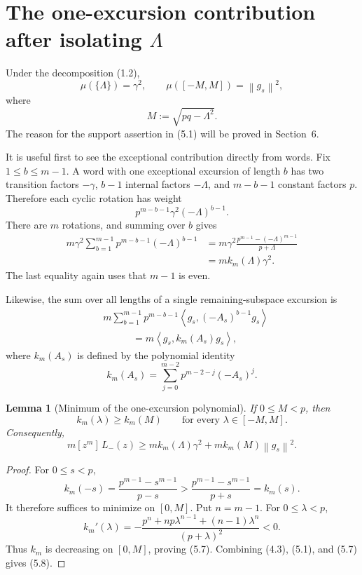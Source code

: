 \documentclass[11pt]{article}
\newtheorem{lemma}[proposition]{Lemma}
\newcommand{\ip}[2]{\left\langle #1,#2\right\rangle}
\newcommand{\norm}[1]{\left\lVert #1\right\rVert}
\newcommand{\coeff}[2]{[z^{#1}]\,#2}
\begin{document}
\section{The one-excursion contribution after isolating $\Lambda$}

Under the decomposition (1.2),
\[
  \mu(\{\Lambda\})=\gamma^2,
  \qquad
  \mu([-M,M])=\norm{g_s}^2,
  \tag{5.1}
\]
where
\[
  M:=\sqrt{pq-\Lambda^2}.
  \tag{5.2}
\]
The reason for the support assertion in (5.1) will be proved in
Section~6.

It is useful first to see the exceptional contribution directly from words.
Fix $1\leq b\leq m-1$.  A word with one exceptional excursion of length $b$
has two transition factors $-\gamma$, $b-1$ internal factors $-\Lambda$, and
$m-b-1$ constant factors $p$.  Therefore each cyclic rotation has weight
\[
  p^{m-b-1}\gamma^2(-\Lambda)^{b-1}.
  \tag{5.3}
\]
There are $m$ rotations, and summing over $b$ gives
\begin{equation}
\begin{aligned}
  m\gamma^2\sum_{b=1}^{m-1}p^{m-b-1}(-\Lambda)^{b-1}
  &=m\gamma^2
    \frac{p^{m-1}-(-\Lambda)^{m-1}}{p+\Lambda}\\
  &=m k_m(\Lambda)\gamma^2.
\end{aligned}  
  \tag{5.4}
\end{equation}
The last equality again uses that $m-1$ is even.

Likewise, the sum over all lengths of a single remaining-subspace excursion
is
\begin{equation}
\begin{aligned}
  &m\sum_{b=1}^{m-1}
    p^{m-b-1}\ip{g_s}{(-A_s)^{b-1}g_s}\\
  &\hspace{3em}=m\ip{g_s}{k_m(A_s)g_s},
\end{aligned}
  \tag{5.5}
\end{equation}
where $k_m(A_s)$ is defined by the polynomial identity
\[
  k_m(A_s)=\sum_{j=0}^{m-2}p^{m-2-j}(-A_s)^j.
  \tag{5.6}
\]

\begin{lemma}[Minimum of the one-excursion polynomial]
If $0\leq M<p$, then
\[
  k_m(\lambda)\geq k_m(M)
  \qquad\text{for every }\lambda\in[-M,M].
  \tag{5.7}
\]
Consequently,
\[
  m\coeff{m}{L_-(z)}
  \geq
  m k_m(\Lambda)\gamma^2
  +m k_m(M)\norm{g_s}^2.
  \tag{5.8}
\]
\end{lemma}

\begin{proof}
For $0\leq s<p$,
\[
  k_m(-s)=\frac{p^{m-1}-s^{m-1}}{p-s}
  >\frac{p^{m-1}-s^{m-1}}{p+s}=k_m(s).
  \tag{5.9}
\]
It therefore suffices to minimize on $[0,M]$.  Put $n=m-1$.  For
$0\leq\lambda<p$,
\[
  k_m'(\lambda)
  =-\frac{p^n+np\lambda^{n-1}+(n-1)\lambda^n}
          {(p+\lambda)^2}<0.
  \tag{5.10}
\]
Thus $k_m$ is decreasing on $[0,M]$, proving (5.7).  Combining (4.3),
(5.1), and (5.7) gives (5.8).
\end{proof}
\end{document}
